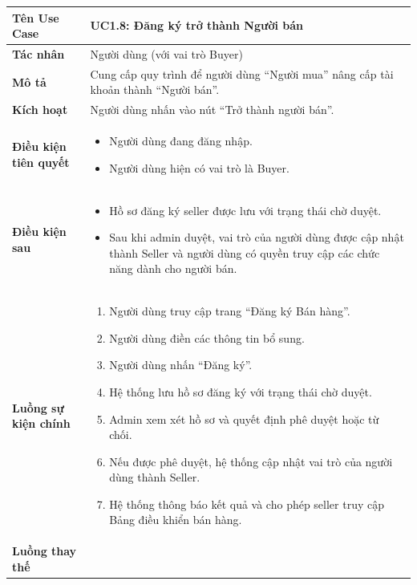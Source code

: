 \begin{table}[H]
\centering
\begin{tabularx}{\textwidth}{|l|X|}
\hline
\textbf{Tên Use Case} & \textbf{UC1.8: Đăng ký trở thành Người bán} \\ \hline
\textbf{Tác nhân} & Người dùng (với vai trò Buyer) \\ \hline
\textbf{Mô tả} & Cung cấp quy trình để người dùng ``Người mua'' nâng cấp tài khoản thành ``Người bán''. \\ \hline
\textbf{Kích hoạt} & Người dùng nhấn vào nút ``Trở thành người bán''. \\ \hline
\textbf{Điều kiện tiên quyết} & 
\begin{itemize}
    \item Người dùng đang đăng nhập.
    \item Người dùng hiện có vai trò là Buyer.
\end{itemize} \\ \hline
\textbf{Điều kiện sau} & 
\begin{itemize}
    \item Hồ sơ đăng ký seller được lưu với trạng thái chờ duyệt.
    \item Sau khi admin duyệt, vai trò của người dùng được cập nhật thành Seller và người dùng có quyền truy cập các chức năng dành cho người bán.
\end{itemize} \\ \hline
\textbf{Luồng sự kiện chính} & 
\begin{enumerate}
    \item Người dùng truy cập trang ``Đăng ký Bán hàng''.
    \item Người dùng điền các thông tin bổ sung.
    \item Người dùng nhấn ``Đăng ký''.
    \item Hệ thống lưu hồ sơ đăng ký với trạng thái chờ duyệt.
    \item Admin xem xét hồ sơ và quyết định phê duyệt hoặc từ chối.
    \item Nếu được phê duyệt, hệ thống cập nhật vai trò của người dùng thành Seller.
    \item Hệ thống thông báo kết quả và cho phép seller truy cập Bảng điều khiển bán hàng.
\end{enumerate} \\ \hline
\textbf{Luồng thay thế} & 
\begin{itemize}

\end{itemize}
\end{tabularx}
\end{table}

